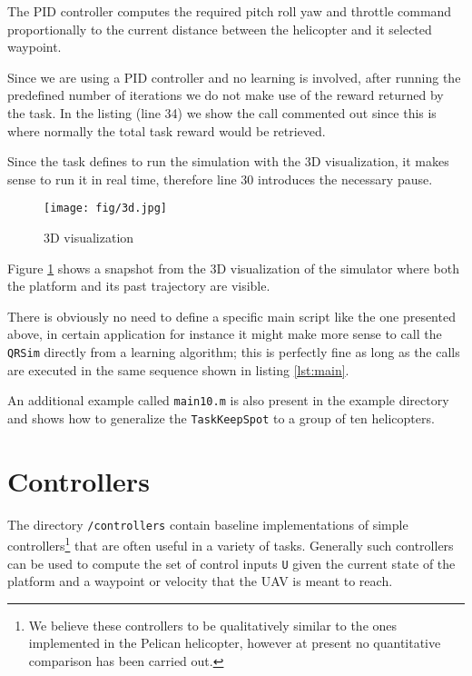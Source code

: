\documentclass[a4paper,11pt]{report}
\newcommand{\snamettt}{\texttt{QRSim}\xspace}
\begin{document}
The PID controller computes the required pitch roll yaw and throttle command proportionally to the current distance between the helicopter and it selected waypoint.

Since we are using a PID controller and no learning is involved, after running the predefined number of iterations we do not make use of the reward returned by the task. In the listing (line 34) we show the call commented out since this is where normally the total task reward would be retrieved.

Since the task defines to run the simulation with the 3D visualization, it makes sense to run it in real time, therefore line 30 introduces the necessary pause.  

\begin{figure}
\begin{center}
\label{fig:3d}
\texttt{[image: fig/3d.jpg]}
 \caption{3D visualization}
\end{center}
\end{figure}

Figure \ref{fig:3d} shows a snapshot from the 3D visualization of the simulator where both the platform and its past trajectory are visible.

There is obviously no need to define a specific main script like the one presented above, in certain application for instance it might make more sense to call the \snamettt directly from  a learning algorithm; this is perfectly fine as long as the calls are executed in the same sequence shown in listing \ref{lst:main}.

An additional example called \texttt{main10.m} is also present in the example directory and shows how to generalize the \texttt{TaskKeepSpot} to a group of ten helicopters.

\section{Controllers}

The directory \texttt{/controllers} contain baseline implementations of simple controllers\footnote{We believe these controllers to be qualitatively similar to the ones implemented in the Pelican helicopter, however at present no quantitative comparison has been carried out.} that are often useful in a variety of tasks. Generally such controllers can be used to compute the set of control inputs \texttt{U} given the current state of the platform and a waypoint or velocity that the UAV is meant to reach. 
\end{document}
